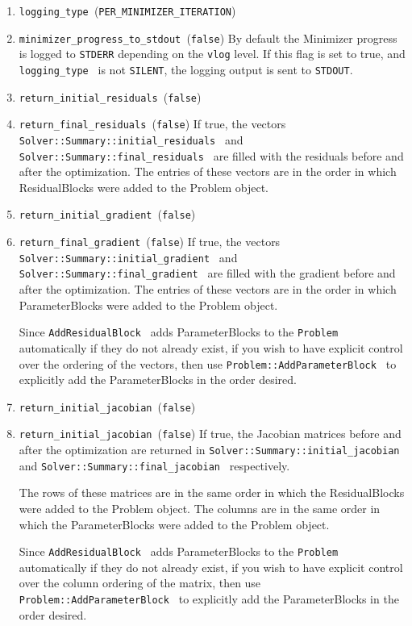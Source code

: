 \begin{enumerate}
\item{\texttt{logging\_type }}(\texttt{PER\_MINIMIZER\_ITERATION})


\item{\texttt{minimizer\_progress\_to\_stdout }}(\texttt{false})
By default the Minimizer progress is logged to \texttt{STDERR}
depending on the \texttt{vlog} level. If this flag is
set to true, and \texttt{logging\_type } is not \texttt{SILENT}, the
logging output
is sent to \texttt{STDOUT}.

\item{\texttt{return\_initial\_residuals }}(\texttt{false})
\item{\texttt{return\_final\_residuals }}(\texttt{false})
If true, the vectors \texttt{Solver::Summary::initial\_residuals } and
\texttt{Solver::Summary::final\_residuals } are filled with the
residuals before and after the optimization. The entries of these
vectors are in the order in which ResidualBlocks were added to the
Problem object.

\item{\texttt{return\_initial\_gradient }}(\texttt{false})
\item{\texttt{return\_final\_gradient }}(\texttt{false})
If true, the vectors \texttt{Solver::Summary::initial\_gradient } and
\texttt{Solver::Summary::final\_gradient } are filled with the
gradient before and after the optimization. The entries of these
vectors are in the order in which ParameterBlocks were added to the
Problem object.

Since \texttt{AddResidualBlock } adds ParameterBlocks to the
\texttt{Problem } automatically if they do not already exist, if you
wish to have explicit control over the ordering of the vectors, then
use \texttt{Problem::AddParameterBlock } to explicitly add the
ParameterBlocks in the order desired.

\item{\texttt{return\_initial\_jacobian }}(\texttt{false})
\item{\texttt{return\_initial\_jacobian }}(\texttt{false})
If true, the Jacobian matrices before and after the optimization are
returned in \texttt{Solver::Summary::initial\_jacobian } and
\texttt{Solver::Summary::final\_jacobian } respectively.

The rows of these matrices are in the same order in which the
ResidualBlocks were added to the Problem object. The columns are in
the same order in which the ParameterBlocks were added to the Problem
object.

Since \texttt{AddResidualBlock } adds ParameterBlocks to the
\texttt{Problem } automatically if they do not already exist, if you
wish to have explicit control over the column ordering of the matrix,
then use \texttt{Problem::AddParameterBlock } to explicitly add the
ParameterBlocks in the order desired.


\end{enumerate}
